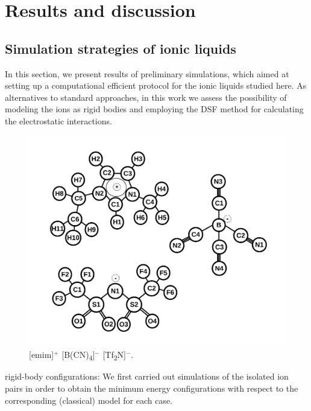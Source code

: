 \documentclass[3p,twocolumn]{elsarticle}
\begin{document}
\section{Results and discussion}
\label{sec:results}

\subsection{Simulation strategies of ionic liquids}
\label{sec:prel_results}

In this section, we present results of preliminary simulations, which aimed at setting up a computational efficient protocol for the ionic liquids studied here.  As alternatives to standard approaches, in this work we assess the possibility of modeling the ions as rigid bodies and employing the DSF method for calculating the electrostatic interactions.

\begin{figure}[H]
\centering
\includegraphics[width=\linewidth]{ions_paper.pdf}
\caption{[emim]$^{+}$ [B(CN)\textsubscript{4}]$^{-}$ [Tf\textsubscript{2}N]$^{-}$.}
\label{fig:scheme}
\end{figure}

rigid-body configurations: We first carried out simulations of the isolated ion pairs in order to obtain the minimum energy configurations with respect to the corresponding (classical) model for each case.
\end{document}
